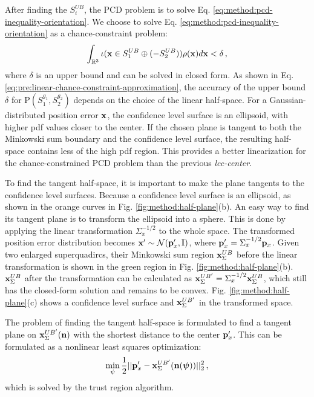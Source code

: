 \documentclass[conference]{IEEEtran}
\newcommand{\II}{\mathbb{I}}
\newcommand{\IR}{\mathbb{R}}
\newcommand{\xx}{{\bf x}}
\newcommand{\pp}{{\bf p}}
\newcommand{\nn}{{\bf n}}
\newcommand{\PP}{\text{P}}
\begin{document}
After finding the $S_i^{UB}$, the PCD problem is to solve Eq. \ref{eq:method:pcd-inequality-orientation}. We choose to solve Eq. \ref{eq:method:pcd-inequality-orientation} as a chance-constraint problem:
\begin{equation}
 \label{eq:method:pcd-lcc}
\int_{\IR^3} \iota(\xx \in S_1^{UB} \oplus (-S_2^{UB})) \rho(\xx)d\xx < \delta \, ,
\end{equation}
where $\delta$ is an upper bound and can be solved in closed form. As shown in Eq. \ref{eq:pre:linear-chance-constraint-approximation}, the accuracy of the upper bound $\delta$ for $\PP(S_1^{g_1}, S_2^{g_2})$ depends on the choice of the linear half-space. For a Gaussian-distributed position error $\xx$, the confidence level surface is an ellipsoid, with higher pdf values closer to the center. If the chosen plane is tangent to both the Minkowski sum boundary and the confidence level surface, the resulting half-space contains less of the high pdf region. This provides a better linearization for the chance-constrained PCD problem than the previous \textit{lcc-center}.

To find the tangent half-space, it is important to make the plane tangents to the confidence level surfaces. Because a confidence level surface is an ellipsoid, as shown in the orange curves in Fig. \ref{fig:method:half-plane}(b). An easy way to find its tangent plane is to transform the ellipsoid into a sphere. This is done by applying the linear transformation $\Sigma_x^{-1/2}$ to the whole space.  The transformed position error distribution becomes $\xx' \sim \mathcal{N}(\pp_x', \II)$, where $\pp_x'=\Sigma_x^{-1/2}\pp_x$. Given two enlarged superquadircs, their Minkowski sum region $\xx_\Sigma^{UB}$ before the linear transformation is shown in the green region in Fig. \ref{fig:method:half-plane}(b). $\xx_\Sigma^{UB}$ after the transformation can be calculated as $\xx_\Sigma^{UB'} = \Sigma_x^{-1/2} \xx_\Sigma^{UB}$, which still has the closed-form solution and remains to be convex. Fig. \ref{fig:method:half-plane}(c) shows a confidence level surface and $\xx_\Sigma^{UB'}$ in the transformed space.

The problem of finding the tangent half-space is formulated to find a tangent plane on $\xx_\Sigma^{UB'}(\nn)$ with the shortest distance to the center $\pp_x'$. This can be formulated as a nonlinear least squares optimization:
\begin{equation}
\label{eq:method:least-squares}
\min_\psi \frac{1}{2}||\pp_x'-\xx_\Sigma^{UB'}(\nn(\boldsymbol{\psi}))||_2^2 \, ,
\end{equation}
which is solved by the trust region algorithm. 
\end{document}
